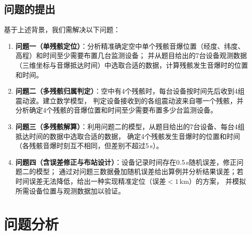 \documentclass[draft,12pt,a4paper]{ctexart}
\theoremstyle{definition}
\begin{document}
\subsection{问题的提出}
基于上述背景，我们需解决以下问题：
\begin{enumerate}[label=\arabic*.]
  \item \textbf{问题一（单残骸定位）}：分析精准确定空中单个残骸音爆位置（经度、纬度、高程）和时间至少需要布置几台监测设备；
  并从题目给出的7台设备观测数据（三维坐标与音爆抵达时间）中选取合适的数据，计算残骸发生音爆时的位置和时间。
  \item \textbf{问题二（多残骸归属判定）}：空中有4个残骸时，每台设备按时间先后收到4组震动波。建立数学模型，
  判定设备接收到的各组震动波来自哪一个残骸，并分析确定4个残骸的音爆位置和时间至少需要布置多少台监测设备。
  \item \textbf{问题三（多残骸解算）}：利用问题二的模型，从题目给出的7台设备、每台4组抵达时间的数据中选取合适的数据，
  确定4个残骸发生音爆时的位置和时间（各残骸音爆时刻互不相同，但差别不超过5\,s）。
  \item \textbf{问题四（含误差修正与布站设计）}：设备记录时间存在0.5\,s随机误差，修正问题二的模型；
  通过对问题三数据叠加随机误差给出算例并分析结果误差；若时间误差无法降低，给出一种实现精准定位（误差$<1$\,km）的方案，
  并模拟所需设备位置与观测数据加以验证。
\end{enumerate}

\section{问题分析}
\end{document}
